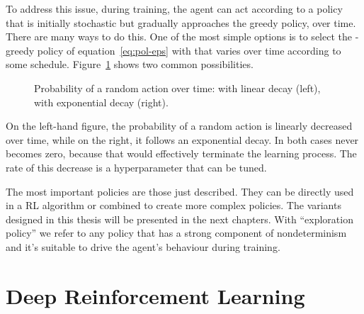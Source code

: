 To address this issue, during training, the agent can act according to a
policy that is initially stochastic but gradually approaches the greedy
policy, over time. There are many ways to do this. One of the most simple
options is to select the \eps{}-greedy policy of equation~\eqref{eq:pol-eps}
with \eps{} that varies over time according to some schedule.
Figure~\ref{fig:policy-schedules} shows two common possibilities.
\begin{figure}
	\centering
	\qquad
	\caption{Probability of a random action over time: \eps{} with linear decay
	(left), \eps{} with exponential decay (right).}
	\label{fig:policy-schedules}
\end{figure}
On the left-hand figure, the probability of a random action is linearly
decreased over time, while on the right, it follows an exponential decay. In
both cases \eps{} never becomes zero, because that would effectively terminate
the learning process. The rate of this decrease is a hyperparameter that
can be tuned.

The most important policies are those just described. They can be directly
used in a RL algorithm or combined to create more complex policies.  The
variants designed in this thesis will be presented in the next chapters.  With
``exploration policy'' we refer to any policy that has a strong component of
nondeterminism and it's suitable to drive the agent's behaviour during
training.


\section{Deep Reinforcement Learning}

\label{sec:deep-rl}

